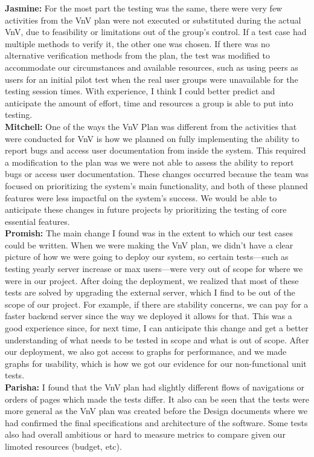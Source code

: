 \documentclass[12pt, titlepage]{article}
\begin{document}
\begin{enumerate}
  \textbf{ Jasmine:} For the most part the testing was the same, there were very few activities from the VnV plan were not executed or substituted during the actual VnV, due to feasibility or limitations out of the group's control. If a test case had multiple methods to verify it, the other one was chosen. If there was no alternative verification methods from the plan, the test was modified to accommodate our circumstances and available resources, such as using peers as users for an initial pilot test when the real user groups were unavailable for the testing session times. With experience, I think I could better predict and anticipate the amount of effort, time and resources a group is able to put into testing.\\
  \textbf{Mitchell:} One of the ways the VnV Plan was different from the activities that were conducted for VnV is how we planned on fully implementing the ability to report bugs and access user documentation from inside the system. This required a modification to the plan was we were not able to assess the ability to report bugs or access user documentation. These changes occurred because the team was focused on prioritizing the system’s main functionality, and both of these planned features were less impactful on the system’s success. We would be able to anticipate these changes in future projects by prioritizing the testing of core essential features. \\
  \textbf{Promish:} The main change I found was in the extent to which our test cases could be written. When we were making the VnV plan, we didn’t have a clear picture of how we were going to deploy our system, so certain tests—such as testing yearly server increase or max users—were very out of scope for where we were in our project. After doing the deployment, we realized that most of these tests are solved by upgrading the external server, which I find to be out of the scope of our project. For example, if there are stability concerns, we can pay for a faster backend server since the way we deployed it allows for that. This was a good experience since, for next time, I can anticipate this change and get a better understanding of what needs to be tested in scope and what is out of scope. After our deployment, we also got access to graphs for performance, and we made graphs for usability, which is how we got our evidence for our non-functional unit tests.\\
  \textbf{Parisha:} I found that the VnV plan had slightly different flows of navigations or orders of pages which made the tests differ. It also can be seen that the tests were more general as the VnV plan was created before the Design documents where we had confirmed the final specifications and architecture of the software. Some tests also had overall ambitious or hard to measure metrics to compare given our limoted resources (budget, etc). \\
\end{enumerate}
\end{document}
